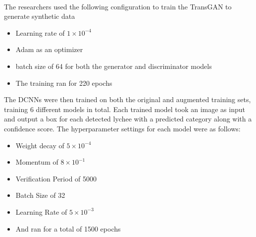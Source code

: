 \\
The researchers used the following configuration to train the TransGAN to generate synthetic data
\begin{itemize}
    \item Learning rate of $1 \times 10 ^ {-4}$
    \item Adam as an optimizer
    \item batch size of 64 for both the generator and discriminator models
    \item The training ran for 220 epochs
\end{itemize}

The DCNNs were then trained on both the original and augmented training sets, training 6 different models in total.  Each trained model took an image as input and output a box for each detected lychee with a predicted  category along with a confidence score.  The hyperparameter settings for each model were as follows:
\begin{itemize}
    \item Weight decay of $5 \times 10 ^{-4}$
    \item Momentum of $8 \times 10^{-1}$
    \item Verification Period of 5000
    \item Batch Size of 32
    \item Learning Rate of $5 \times 10^{-3}$
    \item And ran for a total of 1500 epochs
\end{itemize}

